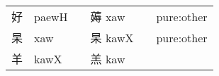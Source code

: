 \documentclass[14pt,a4paper]{scrartcl}
\begin{document}
\begin{longtable}[c]{@{}llllll@{}}
\begin{minipage}[t]{0.14\columnwidth}
好
\strut\end{minipage} &
\begin{minipage}[t]{0.14\columnwidth}\raggedright\strut
paewH
\strut\end{minipage} &
\begin{minipage}[t]{0.14\columnwidth}\raggedright\strut
\strut\end{minipage} &
\begin{minipage}[t]{0.14\columnwidth}\raggedright\strut
薅 xaw
\strut\end{minipage} &
\begin{minipage}[t]{0.14\columnwidth}\raggedright\strut
\strut\end{minipage} &
\begin{minipage}[t]{0.14\columnwidth}\raggedright\strut
pure:other
\strut\end{minipage}\tabularnewline
\begin{minipage}[t]{0.14\columnwidth}\raggedright\strut
杲
\strut\end{minipage} &
\begin{minipage}[t]{0.14\columnwidth}\raggedright\strut
xaw
\strut\end{minipage} &
\begin{minipage}[t]{0.14\columnwidth}\raggedright\strut
\strut\end{minipage} &
\begin{minipage}[t]{0.14\columnwidth}\raggedright\strut
杲 kawX
\strut\end{minipage} &
\begin{minipage}[t]{0.14\columnwidth}\raggedright\strut
\strut\end{minipage} &
\begin{minipage}[t]{0.14\columnwidth}\raggedright\strut
pure:other
\strut\end{minipage}\tabularnewline
\begin{minipage}[t]{0.14\columnwidth}\raggedright\strut
羊
\strut\end{minipage} &
\begin{minipage}[t]{0.14\columnwidth}\raggedright\strut
kawX
\strut\end{minipage} &
\begin{minipage}[t]{0.14\columnwidth}\raggedright\strut
\strut\end{minipage} &
\begin{minipage}[t]{0.14\columnwidth}\raggedright\strut
羔 kaw
\strut\end{minipage} &
\begin{minipage}[t]{0.14\columnwidth}\raggedright\strut

\end{minipage}
\end{longtable}
\end{document}

